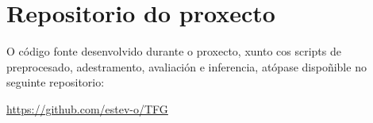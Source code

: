 \chapter{Repositorio do proxecto}
\label{chap:repositorio}

O código fonte desenvolvido durante o proxecto, xunto cos scripts de preprocesado, adestramento,
avaliación e inferencia, atópase dispoñible no seguinte repositorio:

\begin{center}
    \url{https://github.com/estev-o/TFG}
\end{center}
